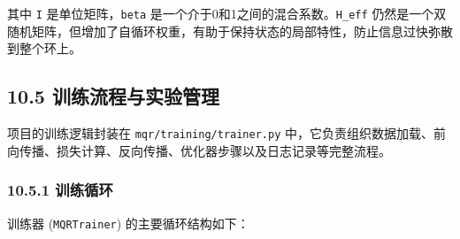\documentclass[
  12pt,
]{article}
\begin{document}
其中 \texttt{I} 是单位矩阵，\texttt{beta}
是一个介于0和1之间的混合系数。\texttt{H\_eff}
仍然是一个双随机矩阵，但增加了自循环权重，有助于保持状态的局部特性，防止信息过快弥散到整个环上。

\hypertarget{ux8badux7ec3ux6d41ux7a0bux4e0eux5b9eux9a8cux7ba1ux7406}{%
\subsection{10.5
训练流程与实验管理}\label{ux8badux7ec3ux6d41ux7a0bux4e0eux5b9eux9a8cux7ba1ux7406}}

项目的训练逻辑封装在 \texttt{mqr/training/trainer.py}
中，它负责组织数据加载、前向传播、损失计算、反向传播、优化器步骤以及日志记录等完整流程。

\hypertarget{ux8badux7ec3ux5faaux73af}{%
\subsubsection{10.5.1 训练循环}\label{ux8badux7ec3ux5faaux73af}}

训练器 (\texttt{MQRTrainer}) 的主要循环结构如下：
\end{document}
